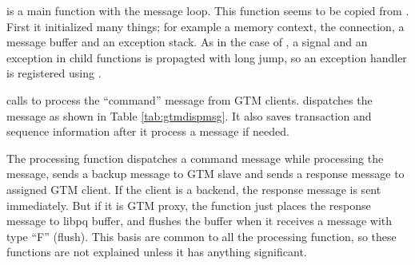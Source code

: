    is a main function with the message loop.
  This function seems to be copied from .
  First it initialized many things; for example a memory context, the connection,
  a message buffer and an exception stack.
  As in the case of \PG, a signal and an exception in child functions is propagted with long jump, so an
  exception handler is registered using .

   calls  to process the ``command'' message
  from GTM clients.
   dispatches the message as shown in Table \ref{tab:gtmdispmsg}.
  It also saves transaction and sequence information after it process a message if needed.

  The processing function dispatches a command message while processing the message, sends
  a backup message to GTM slave and sends a response message to assigned GTM client.
  If the client is a backend, the response message is sent immediately.
  But if it is GTM proxy, the function just places the response message to libpq buffer,
  and flushes the buffer when it receives a message with type ``F'' (flush).
  This basis are common to all the processing function, so these functions are not explained
  unless it has anything significant.

